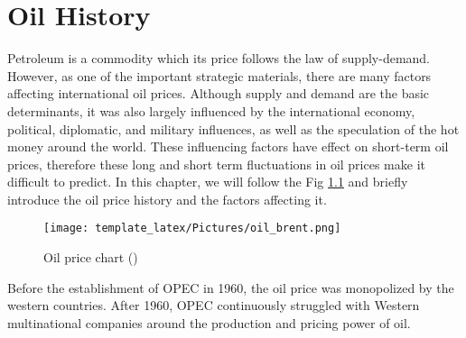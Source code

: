 \chapter{Oil History}

Petroleum is a commodity which its price follows the law of supply-demand. However, as one of the important strategic materials, there are many factors affecting international oil prices. 
Although supply and demand are the basic determinants, it was also largely influenced by the international economy, political, diplomatic, and military influences, as well as the speculation of the hot money around the world. These influencing factors have effect on short-term oil prices, therefore these long and short term fluctuations in oil prices make it difficult to predict. In this chapter, we will follow the Fig \ref{oilPrice} and briefly introduce the oil price history and the factors affecting it.

\begin{figure}[h]
    \centering
    \texttt{[image: template\_latex/Pictures/oil\_brent.png]}
    \caption{Oil price chart (\cite{brent})}
    \label{oilPrice}
\end{figure}

Before the establishment of OPEC in 1960, the oil price was monopolized by the western countries. After 1960, OPEC continuously struggled with Western multinational companies around the production and pricing power of oil.

